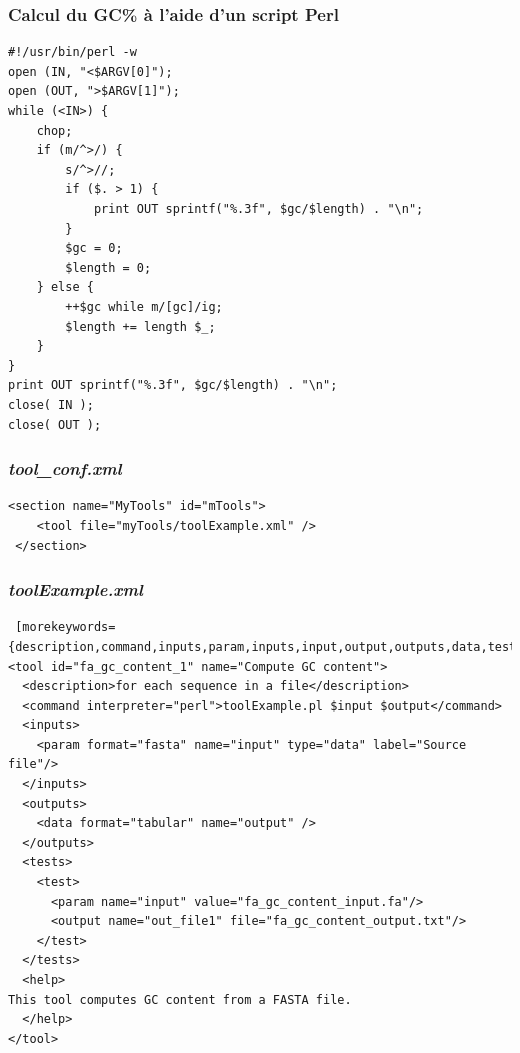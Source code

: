 \documentclass[12pt]{beamer}
\begin{document}
\begin{frame}[fragile]
\frametitle{Calcul du GC\% à l'aide d'un script Perl}
\lstset{language=Perl}
\begin{lstlisting}
#!/usr/bin/perl -w
open (IN, "<$ARGV[0]");
open (OUT, ">$ARGV[1]");
while (<IN>) {
    chop;
    if (m/^>/) {
        s/^>//;
        if ($. > 1) {
            print OUT sprintf("%.3f", $gc/$length) . "\n";
        }
        $gc = 0;
        $length = 0;
    } else {
        ++$gc while m/[gc]/ig;
        $length += length $_;
    }
}
print OUT sprintf("%.3f", $gc/$length) . "\n";
close( IN );
close( OUT );
 \end{lstlisting} 
\end{frame}

\begin{frame}[fragile]
\frametitle{\textit{tool\_conf.xml}}
\lstset{language=XML}
\begin{lstlisting}[morekeywords={section,tool},basicstyle=\small,numberstyle=\scriptsize\color{red}]
<section name="MyTools" id="mTools">
    <tool file="myTools/toolExample.xml" />
 </section>
 \end{lstlisting} 
\end{frame}
\begin{frame}[fragile]
\frametitle{\textit{toolExample.xml}}
\lstset{language=XML}
\begin{lstlisting} [morekeywords={description,command,inputs,param,inputs,input,output,outputs,data,tests,test,help,tool}]
<tool id="fa_gc_content_1" name="Compute GC content">
  <description>for each sequence in a file</description>
  <command interpreter="perl">toolExample.pl $input $output</command>
  <inputs>
    <param format="fasta" name="input" type="data" label="Source file"/>
  </inputs>
  <outputs>
    <data format="tabular" name="output" />
  </outputs>
  <tests>
    <test>
      <param name="input" value="fa_gc_content_input.fa"/>
      <output name="out_file1" file="fa_gc_content_output.txt"/>
    </test>
  </tests>
  <help>
This tool computes GC content from a FASTA file.
  </help>
</tool>
 \end{lstlisting}
\end{frame}
\end{document}
